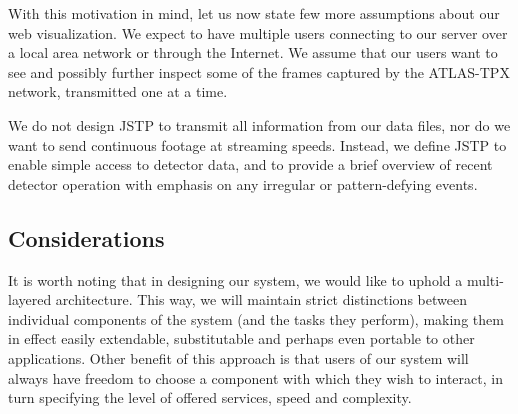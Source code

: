 With this motivation in mind, let us now state few more assumptions about our web visualization. We expect to have multiple users connecting to our server over a local area network or through the Internet. We assume that our users want to see and possibly further inspect some of the frames captured by the ATLAS-TPX network, transmitted one at a time.

We do not design JSTP to transmit all information from our data files, nor do we want to send continuous footage at streaming speeds. Instead, we define JSTP to enable simple access to detector data, and to provide a brief overview of recent detector operation with emphasis on any irregular or pattern-defying events.

\subsection{Considerations}
It is worth noting that in designing our system, we would like to uphold a multi-layered architecture. This way, we will maintain strict distinctions between individual components of the system (and the tasks they perform), making them in effect easily extendable, substitutable and perhaps even portable to other applications. Other benefit of this approach is that users of our system will always have freedom to choose a component with which they wish to interact, in turn specifying the level of offered services, speed and complexity.


